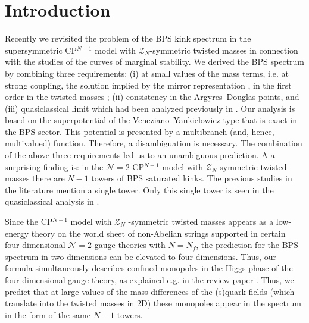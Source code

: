 \documentclass[epsfig,12pt]{article}
\newcommand{\mc}[1]{\mathcal{#1}}
\begin{document}
\tableofcontents

\newpage

\section{Introduction}
\setcounter{equation}{0}

	Recently we revisited the problem of  the BPS kink spectrum in 
	the supersymmetric CP$^{N-1}$ model with $\mc{Z}_N$-symmetric twisted masses 
	\cite{Bolokhov:2011mp} in connection with the studies of the curves of marginal stability.
	We derived the BPS spectrum by combining three requirements: (i) at small values of the mass terms, i.e. at strong 
	coupling, the solution implied by the mirror representation \cite{MR1,MR2}, in the first order in the twisted 
	masses \cite{Shifman:2010id}; (ii) consistency in the Argyres--Douglas points, and 
	(iii) quasiclassical limit which had been analyzed previously in \cite{Dor}. 
	Our analysis is based on the  superpotential of the Veneziano--Yankielowicz type that is
	exact in the BPS sector. This potential is presented by a multibranch (and, hence, multivalued)
	function. Therefore, a disambiguation is necessary. The combination of the above three requirements led us
	to an unambiguous prediction. A 
	a surprising finding is: in the ${\mathcal N} =2$ CP$^{N-1}$ model with  $\mc{Z}_N$-symmetric twisted masses
	there are $N-1$ towers of BPS saturated kinks. The previous studies in the literature mention a single tower. 
	Only this single  tower is seen in the quasiclassical analysis in \cite{Dor}.
	
	Since the CP$^{N-1}$ model with $\mc{Z}_N$ -symmetric twisted masses appears as a low-energy theory on
	the world sheet of non-Abelian strings \cite{Shifman:2004dr} supported in certain four-dimensional ${\mathcal N} =2$
	gauge theories with $N=N_f$, the prediction for the BPS spectrum in two dimensions can be elevated to four dimensions.
	Thus, our formula simultaneously describes confined monopoles in the Higgs phase of the four-dimensional gauge theory,
	as explained e.g. in the review paper   \cite{Shifman:2007ce}.
	Thus, we predict that at large values of the mass differences of the (s)quark fields
	(which translate into the twisted masses in 2D)  these monopoles appear in the spectrum in the form of 
	the same $N-1$ towers.
	
\end{document}
